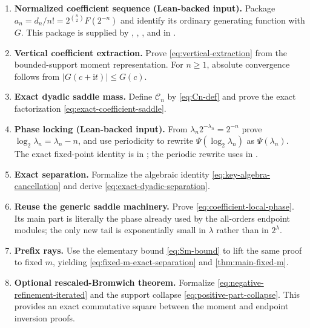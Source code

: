 \documentclass[11pt,oneside]{article}
\theoremstyle{definition}
\theoremstyle{remark}
\newcommand{\ii}{\mathrm i}
\newcommand{\CoeffMass}{\mathcal C}
\begin{document}
\begin{enumerate}
\item \textbf{Normalized coefficient sequence (Lean-backed input).}  Package
$a_n=d_n/n!=2^{\binom n2}F(2^{-n})$ and identify its ordinary generating function with $G$.
This package is supplied by
,
,
, and
 in
.

\item \textbf{Vertical coefficient extraction.}  Prove
\eqref{eq:vertical-extraction} from the bounded-support moment representation.  For $n\ge1$, absolute convergence follows from
$|G(c+\ii t)|\le G(c)$.

\item \textbf{Exact dyadic saddle mass.}  Define $\CoeffMass_n$ by
\eqref{eq:Cn-def} and prove the exact factorization
\eqref{eq:exact-coefficient-saddle}.

\item \textbf{Phase locking (Lean-backed input).}  From
$\lambda_n2^{-\lambda_n}=2^{-n}$ prove
$\log_2\lambda_n=\lambda_n-n$, and use periodicity to rewrite
$\Psi(\log_2\lambda_n)$ as $\Psi(\lambda_n)$.
The exact fixed-point identity is  in
; the periodic rewrite uses
 in .

\item \textbf{Exact separation.}  Formalize the algebraic identity
\eqref{eq:key-algebra-cancellation} and derive
\eqref{eq:exact-dyadic-separation}.

\item \textbf{Reuse the generic saddle machinery.}  Prove
\eqref{eq:coefficient-local-phase}.  Its main part is literally the phase already used by the all-orders endpoint modules; the only new tail is exponentially small in $\lambda$ rather than in $2^\lambda$.

\item \textbf{Prefix rays.}  Use the elementary bound
\eqref{eq:Sm-bound} to lift the same proof to fixed $m$, yielding
\eqref{eq:fixed-m-exact-separation} and \cref{thm:main-fixed-m}.

\item \textbf{Optional rescaled-Bromwich theorem.}  Formalize
\eqref{eq:negative-refinement-iterated} and the support collapse
\eqref{eq:positive-part-collapse}.  This provides an exact commutative square between the moment and endpoint inversion proofs.
\end{enumerate}
\end{document}
